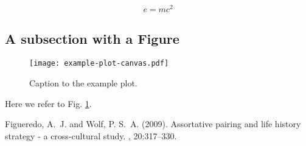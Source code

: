 \documentclass{is2014}
\begin{document}
\begin{multicols}{2}
\lipsum[5] %
\begin{equation}
\label{eq:emc}
e = mc^2
\end{equation}

\subsection{A subsection with a Figure}
\lipsum[6] %
\begin{figure}[H]
   \centering
   \texttt{[image: example-plot-canvas.pdf]} %
   \caption{Caption to the example plot.}
   \label{fig:example}
\end{figure}
\lipsum[7] %
Here we refer to Fig. \ref{fig:example}.


\begin{thebibliography}{99} %

Figueredo, A.~J. and Wolf, P. S.~A. (2009).
\newblock Assortative pairing and life history strategy - a cross-cultural
  study.
, 20:317--330.
 
\end{thebibliography}


\end{multicols}
\end{document}
